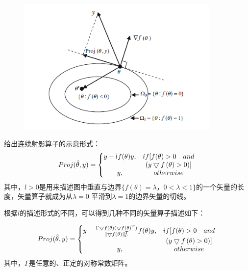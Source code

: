 \begin{figure}
\label{fig:chap5:F1}
\centering
\includegraphics[width = 10cm]{figure/chap5/proj.png}
\end{figure}
给出连续射影算子的示意形式：
\begin{equation}
\label{eq018}
Proj(\hat \theta, y) = \left\{\begin{matrix}
y- l f(\theta) y, & if [f( \theta) > 0   \quad and  \\
  &  (y\bigtriangledown f\left ( \theta \right ) >0 )]\\
y, & otherwise \\
\end{matrix}\right.\\
\end{equation}
其中，$l>0$是用来描述图中垂直与边界$\{ f(\theta) = \lambda，0 < \lambda < 1\}$的一个矢量的长度，矢量算子就成为从$\lambda =0$ 平滑到$\lambda =1 $的边界矢量的切线。

根据$l$的描述形式的不同，可以得到几种不同的矢量算子描述如下：

\begin{equation}
\label{eq018}
Proj(\hat \theta, y) = \left\{\begin{matrix}
y-   \frac{ \Gamma \bigtriangledown f(\theta) ( \bigtriangledown f(\theta)^T)}{\left \| \bigtriangledown f(\theta) \right \|_\Gamma ^T}  f(\theta) y, & if [f( \theta) > 0   \quad and  \\
  &  (y\bigtriangledown f\left ( \theta \right ) >0 )]\\
y, & otherwise\\
\end{matrix}\right.\\
\end{equation}
其中，$\Gamma$是任意的、正定的对称常数矩阵。

